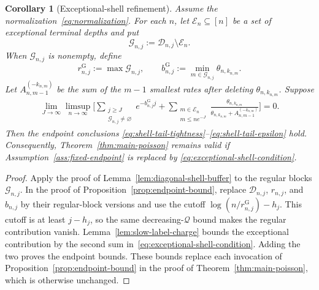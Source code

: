 \documentclass[11pt]{article}
\newtheorem{corollary}[theorem]{Corollary}
\theoremstyle{remark}
\theoremstyle{plain}
\begin{document}
\begin{corollary}[Exceptional-shell refinement]
\label{cor:exceptional-shell-refinement}
Assume the normalization~\eqref{eq:normalization}.  For each $n$, let
$\mathcal E_n\subseteq[n]$ be a set of exceptional terminal depths and put
\[
 \mathcal G_{n,j}:=\mathcal D_{n,j}\setminus\mathcal E_n.
\]
When $\mathcal G_{n,j}$ is nonempty, define
\[
 r^{\mathrm G}_{n,j}:=\max\mathcal G_{n,j},
 \qquad
 b^{\mathrm G}_{n,j}
 :=\min_{m\in\mathcal G_{n,j}}\theta_{n,k_{n,m}}.
\]
Let $A_{n,m-1}^{(-k_{n,m})}$ be the sum of the $m-1$ smallest rates after
deleting $\theta_{n,k_{n,m}}$.  Suppose
\begin{align}
 \lim_{J\to\infty}\limsup_{n\to\infty}
 \bigg[
 \sum_{\substack{j\ge J\\\mathcal G_{n,j}\ne\varnothing}}
   e^{-b^{\mathrm G}_{n,j}j}
 +
 \sum_{\substack{m\in\mathcal E_n\\m\le ne^{-J}}}
 \frac{\theta_{n,k_{n,m}}}
      {\theta_{n,k_{n,m}}+A_{n,m-1}^{(-k_{n,m})}}
 \bigg]=0.
 \label{eq:exceptional-shell-condition}
\end{align}
Then the endpoint conclusions
\eqref{eq:shell-tail-tightness}--\eqref{eq:shell-tail-epsilon} hold.
Consequently, Theorem~\ref{thm:main-poisson} remains valid if
Assumption~\ref{ass:fixed-endpoint} is replaced by
\eqref{eq:exceptional-shell-condition}.
\end{corollary}

\begin{proof}
Apply the proof of Lemma~\ref{lem:diagonal-shell-buffer} to the regular
blocks $\mathcal G_{n,j}$.  In the proof of
Proposition~\ref{prop:endpoint-bound}, replace $\mathcal D_{n,j}$,
$r_{n,j}$, and $b_{n,j}$ by their regular-block versions and use the cutoff
$\log(n/r^{\mathrm G}_{n,j})-h_j$.  This cutoff is at least $j-h_j$, so the
same decreasing-$\mathcal Q$ bound makes the regular contribution vanish.
Lemma~\ref{lem:slow-label-charge} bounds the exceptional contribution by the
second sum in~\eqref{eq:exceptional-shell-condition}.  Adding the two proves
the endpoint bounds.  These bounds replace each invocation of
Proposition~\ref{prop:endpoint-bound} in the proof of
Theorem~\ref{thm:main-poisson}, which is otherwise unchanged.
\end{proof}
\end{document}
